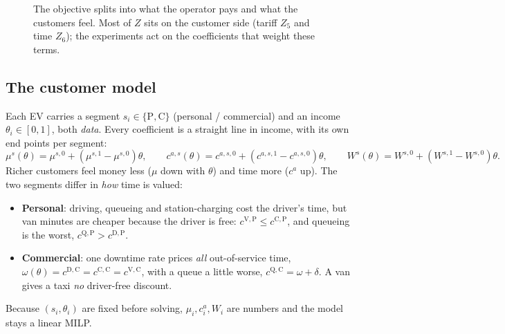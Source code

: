 \begin{figure}[H]
\centering
{}
\caption{The objective splits into what the operator pays and what the customers feel. Most of $Z$ sits on the
customer side (tariff $Z_5$ and time $Z_6$); the experiments act on the coefficients that weight these terms.}
\label{fig:ztree}
\end{figure}

\subsection{The customer model}
Each EV carries a segment $s_i\in\{\mathrm P,\mathrm C\}$ (personal / commercial) and an income $\theta_i\in[0,1]$,
both \emph{data}. Every coefficient is a straight line in income, with its own end points per segment:
\begin{equation}
\mu^{s}(\theta)=\mu^{s,0}+(\mu^{s,1}-\mu^{s,0})\theta,\qquad
c^{a,s}(\theta)=c^{a,s,0}+(c^{a,s,1}-c^{a,s,0})\theta,\qquad
W^{s}(\theta)=W^{s,0}+(W^{s,1}-W^{s,0})\theta.
\label{eq:lines}
\end{equation}
Richer customers feel money less ($\mu$ down with $\theta$) and time more ($c^a$ up). The two segments differ in
\emph{how} time is valued:
\begin{itemize}
  \item \textbf{Personal}: driving, queueing and station-charging cost the driver's time, but van minutes are
  cheaper because the driver is free: $c^{\mathrm V,\mathrm P}\le c^{\mathrm C,\mathrm P}$, and queueing is the
  worst, $c^{\mathrm Q,\mathrm P}>c^{\mathrm D,\mathrm P}$.
  \item \textbf{Commercial}: one downtime rate prices \emph{all} out-of-service time,
  $\omega(\theta)=c^{\mathrm D,\mathrm C}=c^{\mathrm C,\mathrm C}=c^{\mathrm V,\mathrm C}$, with a queue a little
  worse, $c^{\mathrm Q,\mathrm C}=\omega+\delta$. A van gives a taxi \emph{no} driver-free discount.
\end{itemize}
Because $(s_i,\theta_i)$ are fixed before solving, $\mu_i,c^a_i,W_i$ are numbers and the model stays a linear
MILP.

